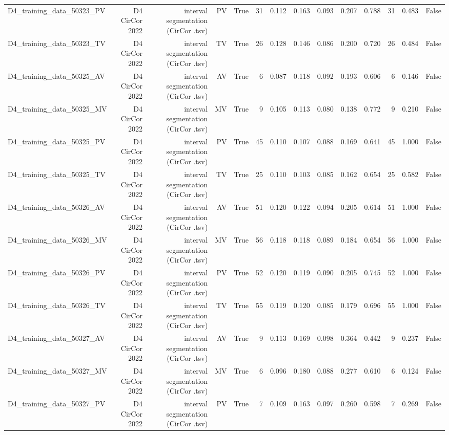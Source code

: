 \begin{table}[htbp]
\begin{tabular}{lrrrrrrrrrrrrr}
    D4\_training\_data\_50323\_PV & D4 CirCor 2022 & interval segmentation (CirCor .tsv) & PV & True & 31 & 0.112 & 0.163 & 0.093 & 0.207 & 0.788 & 31 & 0.483 & False \\
    D4\_training\_data\_50323\_TV & D4 CirCor 2022 & interval segmentation (CirCor .tsv) & TV & True & 26 & 0.128 & 0.146 & 0.086 & 0.200 & 0.720 & 26 & 0.484 & False \\
    D4\_training\_data\_50325\_AV & D4 CirCor 2022 & interval segmentation (CirCor .tsv) & AV & True & 6 & 0.087 & 0.118 & 0.092 & 0.193 & 0.606 & 6 & 0.146 & False \\
    D4\_training\_data\_50325\_MV & D4 CirCor 2022 & interval segmentation (CirCor .tsv) & MV & True & 9 & 0.105 & 0.113 & 0.080 & 0.138 & 0.772 & 9 & 0.210 & False \\
    D4\_training\_data\_50325\_PV & D4 CirCor 2022 & interval segmentation (CirCor .tsv) & PV & True & 45 & 0.110 & 0.107 & 0.088 & 0.169 & 0.641 & 45 & 1.000 & False \\
    D4\_training\_data\_50325\_TV & D4 CirCor 2022 & interval segmentation (CirCor .tsv) & TV & True & 25 & 0.110 & 0.103 & 0.085 & 0.162 & 0.654 & 25 & 0.582 & False \\
    D4\_training\_data\_50326\_AV & D4 CirCor 2022 & interval segmentation (CirCor .tsv) & AV & True & 51 & 0.120 & 0.122 & 0.094 & 0.205 & 0.614 & 51 & 1.000 & False \\
    D4\_training\_data\_50326\_MV & D4 CirCor 2022 & interval segmentation (CirCor .tsv) & MV & True & 56 & 0.118 & 0.118 & 0.089 & 0.184 & 0.654 & 56 & 1.000 & False \\
    D4\_training\_data\_50326\_PV & D4 CirCor 2022 & interval segmentation (CirCor .tsv) & PV & True & 52 & 0.120 & 0.119 & 0.090 & 0.205 & 0.745 & 52 & 1.000 & False \\
    D4\_training\_data\_50326\_TV & D4 CirCor 2022 & interval segmentation (CirCor .tsv) & TV & True & 55 & 0.119 & 0.120 & 0.085 & 0.179 & 0.696 & 55 & 1.000 & False \\
    D4\_training\_data\_50327\_AV & D4 CirCor 2022 & interval segmentation (CirCor .tsv) & AV & True & 9 & 0.113 & 0.169 & 0.098 & 0.364 & 0.442 & 9 & 0.237 & False \\
    D4\_training\_data\_50327\_MV & D4 CirCor 2022 & interval segmentation (CirCor .tsv) & MV & True & 6 & 0.096 & 0.180 & 0.088 & 0.277 & 0.610 & 6 & 0.124 & False \\
    D4\_training\_data\_50327\_PV & D4 CirCor 2022 & interval segmentation (CirCor .tsv) & PV & True & 7 & 0.109 & 0.163 & 0.097 & 0.260 & 0.598 & 7 & 0.269 & False \\

\end{tabular}
\end{table}
